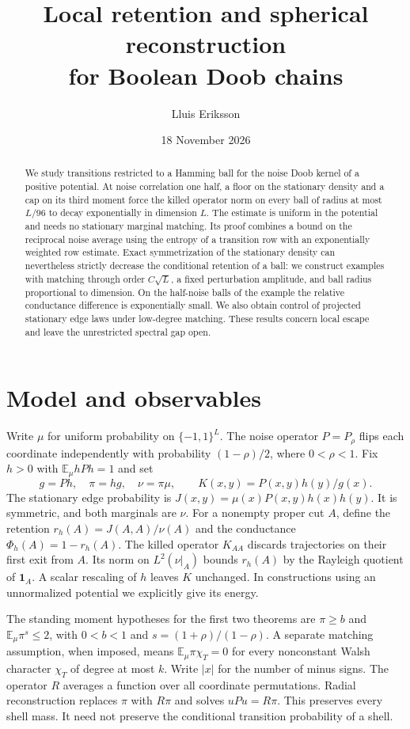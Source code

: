\documentclass[11pt]{article}
\title{Local retention and spherical reconstruction\\for Boolean Doob chains}
\author{Lluis Eriksson}
\date{18 November 2026}
\newcommand{\E}{\mathbb E}
\newcommand{\one}{\mathbf1}
\begin{document}
\maketitle
\begin{abstract}
We study transitions restricted to a Hamming ball for the noise Doob kernel of a positive potential. At noise correlation one half, a floor on the stationary density and a cap on its third moment force the killed operator norm on every ball of radius at most $L/96$ to decay exponentially in dimension $L$. The estimate is uniform in the potential and needs no stationary marginal matching. Its proof combines a bound on the reciprocal noise average using the entropy of a transition row with an exponentially weighted row estimate. Exact symmetrization of the stationary density can nevertheless strictly decrease the conditional retention of a ball: we construct examples with matching through order $C\sqrt L$, a fixed perturbation amplitude, and ball radius proportional to dimension. On the half-noise balls of the example the relative conductance difference is exponentially small. We also obtain control of projected stationary edge laws under low-degree matching. These results concern local escape and leave the unrestricted spectral gap open.
\end{abstract}

\section{Model and observables}
Write $\mu$ for uniform probability on $\{-1,1\}^L$. The noise operator $P=P_\rho$ flips each coordinate independently with probability $(1-\rho)/2$, where $0<\rho<1$. Fix $h>0$ with $\E_\mu hPh=1$ and set
\[
 g=Ph,\quad \pi=hg,\quad \nu=\pi\mu,\qquad K(x,y)=P(x,y)h(y)/g(x).
\]
The stationary edge probability is $J(x,y)=\mu(x)P(x,y)h(x)h(y)$. It is symmetric, and both marginals are $\nu$. For a nonempty proper cut $A$, define the retention $r_h(A)=J(A,A)/\nu(A)$ and the conductance $\Phi_h(A)=1-r_h(A)$. The killed operator $K_{AA}$ discards trajectories on their first exit from $A$. Its norm on $L^2(\nu|_A)$ bounds $r_h(A)$ by the Rayleigh quotient of $\one_A$. A scalar rescaling of $h$ leaves $K$ unchanged. In constructions using an unnormalized potential we explicitly give its energy.

The standing moment hypotheses for the first two theorems are $\pi\ge b$ and $\E_\mu\pi^s\le 2$, with $0<b<1$ and $s=(1+\rho)/(1-\rho)$. A separate matching assumption, when imposed, means $\E_\mu\pi\chi_T=0$ for every nonconstant Walsh character $\chi_T$ of degree at most $k$. Write $|x|$ for the number of minus signs. The operator $R$ averages a function over all coordinate permutations. Radial reconstruction replaces $\pi$ with $R\pi$ and solves $uPu=R\pi$. This preserves every shell mass. It need not preserve the conditional transition probability of a shell.
\end{document}
